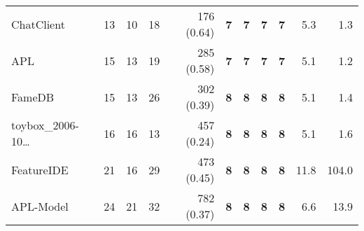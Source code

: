 \begin{table*}
\begin{tiny}
{\begin{tabular}{lrrrrrrrrrr}
ChatClient & \num[text-series-to-math=true]{13} & \num[text-series-to-math=true]{10} & \num[text-series-to-math=true]{18} & \num[text-series-to-math=true]{176} (\num[text-series-to-math=true]{0.64}) & \textbf{\num[text-series-to-math=true]{7}} & \textbf{\num[text-series-to-math=true]{7}} & \textbf{\num[text-series-to-math=true]{7}} & \textbf{\num[text-series-to-math=true]{7}} & 5.3 & 1.3\\
APL & \num[text-series-to-math=true]{15} & \num[text-series-to-math=true]{13} & \num[text-series-to-math=true]{19} & \num[text-series-to-math=true]{285} (\num[text-series-to-math=true]{0.58}) & \textbf{\num[text-series-to-math=true]{7}} & \textbf{\num[text-series-to-math=true]{7}} & \textbf{\num[text-series-to-math=true]{7}} & \textbf{\num[text-series-to-math=true]{7}} & 5.1 & 1.2\\
FameDB & \num[text-series-to-math=true]{15} & \num[text-series-to-math=true]{13} & \num[text-series-to-math=true]{26} & \num[text-series-to-math=true]{302} (\num[text-series-to-math=true]{0.39}) & \textbf{\num[text-series-to-math=true]{8}} & \textbf{\num[text-series-to-math=true]{8}} & \textbf{\num[text-series-to-math=true]{8}} & \textbf{\num[text-series-to-math=true]{8}} & 5.1 & 1.4\\
toybox\_2006-10\ldots & \num[text-series-to-math=true]{16} & \num[text-series-to-math=true]{16} & \num[text-series-to-math=true]{13} & \num[text-series-to-math=true]{457} (\num[text-series-to-math=true]{0.24}) & \textbf{\num[text-series-to-math=true]{8}} & \textbf{\num[text-series-to-math=true]{8}} & \textbf{\num[text-series-to-math=true]{8}} & \textbf{\num[text-series-to-math=true]{8}} & 5.1 & 1.6\\
FeatureIDE & \num[text-series-to-math=true]{21} & \num[text-series-to-math=true]{16} & \num[text-series-to-math=true]{29} & \num[text-series-to-math=true]{473} (\num[text-series-to-math=true]{0.45}) & \textbf{\num[text-series-to-math=true]{8}} & \textbf{\num[text-series-to-math=true]{8}} & \textbf{\num[text-series-to-math=true]{8}} & \textbf{\num[text-series-to-math=true]{8}} & 11.8 & 104.0\\
APL-Model & \num[text-series-to-math=true]{24} & \num[text-series-to-math=true]{21} & \num[text-series-to-math=true]{32} & \num[text-series-to-math=true]{782} (\num[text-series-to-math=true]{0.37}) & \textbf{\num[text-series-to-math=true]{8}} & \textbf{\num[text-series-to-math=true]{8}} & \textbf{\num[text-series-to-math=true]{8}} & \textbf{\num[text-series-to-math=true]{8}} & 6.6 & 13.9\\

\end{tabular}}
\end{tiny}
\end{table*}
